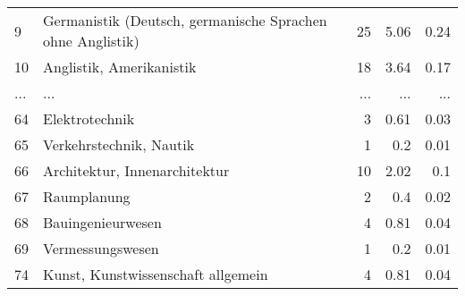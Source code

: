 \begin{longtable}{lXrrr}
        9 & \multicolumn{1}{X}{Germanistik (Deutsch, germanische Sprachen ohne Anglistik)} & %
          \num{25} &
          \num[round-mode=places,round-precision=2]{5.06} &
          \num[round-mode=places,round-precision=2]{0.24} \\
        10 & \multicolumn{1}{X}{Anglistik, Amerikanistik} & %
          \num{18} &
          \num[round-mode=places,round-precision=2]{3.64} &
          \num[round-mode=places,round-precision=2]{0.17} \\
       ... & ... & ... & ... & ... \\
        64 & \multicolumn{1}{X}{Elektrotechnik} & %
          \num{3} &
          \num[round-mode=places,round-precision=2]{0.61} &
          \num[round-mode=places,round-precision=2]{0.03} \\

        65 & \multicolumn{1}{X}{Verkehrstechnik, Nautik} & %
          \num{1} &
          \num[round-mode=places,round-precision=2]{0.2} &
          \num[round-mode=places,round-precision=2]{0.01} \\

        66 & \multicolumn{1}{X}{Architektur, Innenarchitektur} & %
          \num{10} &
          \num[round-mode=places,round-precision=2]{2.02} &
          \num[round-mode=places,round-precision=2]{0.1} \\

        67 & \multicolumn{1}{X}{Raumplanung} & %
          \num{2} &
          \num[round-mode=places,round-precision=2]{0.4} &
          \num[round-mode=places,round-precision=2]{0.02} \\

        68 & \multicolumn{1}{X}{Bauingenieurwesen} & %
          \num{4} &
          \num[round-mode=places,round-precision=2]{0.81} &
          \num[round-mode=places,round-precision=2]{0.04} \\

        69 & \multicolumn{1}{X}{Vermessungswesen} & %
          \num{1} &
          \num[round-mode=places,round-precision=2]{0.2} &
          \num[round-mode=places,round-precision=2]{0.01} \\

        74 & \multicolumn{1}{X}{Kunst, Kunstwissenschaft allgemein} & %
          \num{4} &
          \num[round-mode=places,round-precision=2]{0.81} &
          \num[round-mode=places,round-precision=2]{0.04} \\


\end{longtable}
